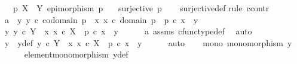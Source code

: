 \begin{isabellebody}
\ \ \ {\isachardoublequoteopen}p{\isacharcolon}{\kern0pt}\ X\ {\isasymrightarrow}\ Y{\isachardoublequoteclose}\ {\isachardoublequoteopen}epimorphism\ p{\isachardoublequoteclose}\isanewline
\ \ \ {\isachardoublequoteopen}surjective\ p{\isachardoublequoteclose}\isanewline
%
\isadelimproof
\ \ %
\endisadelimproof
%
\isatagproof
{}\isamarkupfalse%
\ surjective{\isacharunderscore}{\kern0pt}def\isanewline
{}\isamarkupfalse%
{\isacharparenleft}{\kern0pt}rule\ ccontr{\isacharparenright}{\kern0pt}\isanewline
\ \ \isamarkupfalse%
\ a{}{\isacharcolon}{\kern0pt}\ {\isachardoublequoteopen}{\isasymnot}\ {\isacharparenleft}{\kern0pt}{\isasymforall}y{\isachardot}{\kern0pt}\ y\ {\isasymin}\isactrlsub c\ codomain\ p\ {\isasymlongrightarrow}\ {\isacharparenleft}{\kern0pt}{\isasymexists}x{\isachardot}{\kern0pt}\ x\ {\isasymin}\isactrlsub c\ domain\ p\ {\isasymand}\ p\ {\isasymcirc}\isactrlsub c\ x\ {\isacharequal}{\kern0pt}\ y{\isacharparenright}{\kern0pt}{\isacharparenright}{\kern0pt}{\isachardoublequoteclose}\isanewline
\ \ \isamarkupfalse%
\ {\isachardoublequoteopen}{\isasymexists}y{\isachardot}{\kern0pt}\ y\ {\isasymin}\isactrlsub c\ Y\ {\isasymand}\ {\isasymnot}{\isacharparenleft}{\kern0pt}{\isasymexists}x{\isachardot}{\kern0pt}\ x\ {\isasymin}\isactrlsub c\ X\ {\isasymand}\ p\ {\isasymcirc}\isactrlsub c\ x\ {\isacharequal}{\kern0pt}\ y{\isacharparenright}{\kern0pt}{\isachardoublequoteclose}\isanewline
\ \ \ \ \isamarkupfalse%
\ a{}\ assms{\isacharparenleft}{\kern0pt}{}{\isacharparenright}{\kern0pt}\ cfunc{\isacharunderscore}{\kern0pt}type{\isacharunderscore}{\kern0pt}def\ \isamarkupfalse%
\ auto\isanewline
\ \ \isamarkupfalse%
\ \isamarkupfalse%
\ y{}\ \ y{\isacharunderscore}{\kern0pt}def{\isacharcolon}{\kern0pt}\ {\isachardoublequoteopen}y{}\ {\isasymin}\isactrlsub c\ Y\ {\isasymand}\ {\isacharparenleft}{\kern0pt}{\isasymforall}x{\isachardot}{\kern0pt}\ x\ {\isasymin}\isactrlsub c\ X\ {\isasymlongrightarrow}\ p\ {\isasymcirc}\isactrlsub c\ x\ {\isasymnoteq}\ y{}{\isacharparenright}{\kern0pt}{\isachardoublequoteclose}\isanewline
\ \ \ \ \isamarkupfalse%
\ auto\isanewline
\ \ \isamarkupfalse%
\ mono{\isacharcolon}{\kern0pt}\ {\isachardoublequoteopen}monomorphism\ y{}{\isachardoublequoteclose}\isanewline
\ \ \ \ \isamarkupfalse%
\ element{\isacharunderscore}{\kern0pt}monomorphism\ y{\isacharunderscore}{\kern0pt}def\ \isamarkupfalse%

\end{isabellebody}
